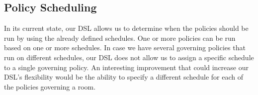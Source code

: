 \subsection{Policy Scheduling}\label{subsec:during}
In its current state, our DSL allows us to determine when the policies should be run by using the already defined schedules. One or more policies can be run based on one or more schedules. 
In case we have several governing policies that run on different schedules, our DSL does not allow us to assign a specific schedule to a single governing policy. An interesting improvement that could increase our DSL's flexibility would be the ability to specify a different schedule for each of the policies governing a room.